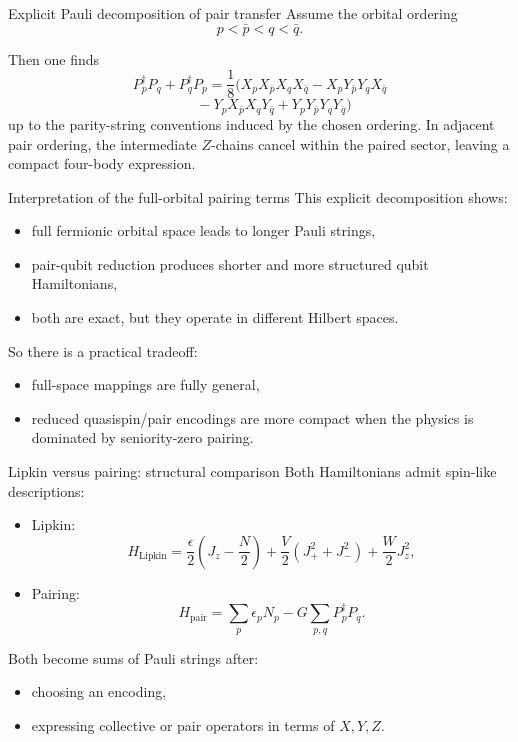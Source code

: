 \documentclass[aspectratio=169]{beamer}
\begin{document}
\begin{frame}{Explicit Pauli decomposition of pair transfer}
Assume the orbital ordering
\[
p < \bar p < q < \bar q.
\]

Then one finds
\[
P_p^\dagger P_q + P_q^\dagger P_p
=
\frac{1}{8}
\Big(
X_p X_{\bar p} X_q X_{\bar q}
-
X_p Y_{\bar p} Y_q X_{\bar q}
\]
\[
\qquad
-
Y_p X_{\bar p} X_q Y_{\bar q}
+
Y_p Y_{\bar p} Y_q Y_{\bar q}
\Big)
\]
up to the parity-string conventions induced by the chosen ordering.
In adjacent pair ordering, the intermediate \(Z\)-chains cancel within the paired sector, leaving a compact four-body expression.
\end{frame}

\begin{frame}{Interpretation of the full-orbital pairing terms}
This explicit decomposition shows:
\begin{itemize}
\item full fermionic orbital space leads to longer Pauli strings,
\item pair-qubit reduction produces shorter and more structured qubit Hamiltonians,
\item both are exact, but they operate in different Hilbert spaces.
\end{itemize}

So there is a practical tradeoff:
\begin{itemize}
\item full-space mappings are fully general,
\item reduced quasispin/pair encodings are more compact when the physics is dominated by seniority-zero pairing.
\end{itemize}
\end{frame}

\begin{frame}{Lipkin versus pairing: structural comparison}
Both Hamiltonians admit spin-like descriptions:
\begin{itemize}
\item Lipkin:
\[
H_{\mathrm{Lipkin}}
=
\frac{\epsilon}{2}\left(J_z-\frac{N}{2}\right)
+\frac{V}{2}(J_+^2+J_-^2)
+\frac{W}{2}J_z^2,
\]
\item Pairing:
\[
H_{\mathrm{pair}}
=
\sum_p \epsilon_p N_p - G\sum_{p,q} P_p^\dagger P_q.
\]
\end{itemize}

Both become sums of Pauli strings after:
\begin{itemize}
\item choosing an encoding,
\item expressing collective or pair operators in terms of \(X,Y,Z\).
\end{itemize}
\end{frame}
\end{document}

